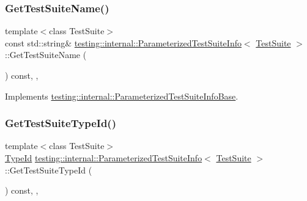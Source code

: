 \subsubsection{\texorpdfstring{Get\+Test\+Suite\+Name()}{GetTestSuiteName()}}
{\footnotesize\ttfamily template$<$class Test\+Suite$>$ \\
const std\+::string\& \hyperlink{classtesting_1_1internal_1_1ParameterizedTestSuiteInfo}{testing\+::internal\+::\+Parameterized\+Test\+Suite\+Info}$<$ \hyperlink{classtesting_1_1TestSuite}{Test\+Suite} $>$\+::Get\+Test\+Suite\+Name (\begin{DoxyParamCaption}{ }\end{DoxyParamCaption}) const\hspace{0.3cm}{\ttfamily [inline]}, {\ttfamily [override]}, {\ttfamily [virtual]}}



Implements \hyperlink{classtesting_1_1internal_1_1ParameterizedTestSuiteInfoBase_aa6e36241431dc72c251ecee9b637b4d3}{testing\+::internal\+::\+Parameterized\+Test\+Suite\+Info\+Base}.

\mbox{\label{classtesting_1_1internal_1_1ParameterizedTestSuiteInfo_af488d1d7c1889a250acff2ea6eba4c84}} 
\subsubsection{\texorpdfstring{Get\+Test\+Suite\+Type\+Id()}{GetTestSuiteTypeId()}}
{\footnotesize\ttfamily template$<$class Test\+Suite$>$ \\
\hyperlink{namespacetesting_1_1internal_ab1114197d3c657d8b7f8e0c5caa12d00}{Type\+Id} \hyperlink{classtesting_1_1internal_1_1ParameterizedTestSuiteInfo}{testing\+::internal\+::\+Parameterized\+Test\+Suite\+Info}$<$ \hyperlink{classtesting_1_1TestSuite}{Test\+Suite} $>$\+::Get\+Test\+Suite\+Type\+Id (\begin{DoxyParamCaption}{ }\end{DoxyParamCaption}) const\hspace{0.3cm}{\ttfamily [inline]}, {\ttfamily [override]}, {\ttfamily [virtual]}}



